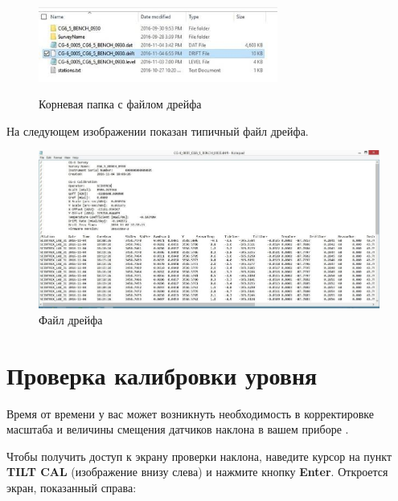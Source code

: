 \begin{figure}[H]
  \centering
  \includegraphics[width=0.7\textwidth]{figures/the_drift_file_under_root_folder}
  \caption{}Корневая папка с файлом дрейфа
  \label{fig:the_drift_file_under_root_folder}
\end{figure}

На следующем изображении показан типичный файл дрейфа.

\begin{figure}[H]
  \centering
  \includegraphics[width=\textwidth]{figures/the_drift_file}
  \caption{Файл дрейфа}
  \label{fig:the_drift_file}
\end{figure}

\section{Проверка калибровки уровня}

Время от времени у вас может возникнуть необходимость в корректировке масштаба и
величины смещения датчиков наклона в вашем приборе \cg{}.


Чтобы получить доступ к экрану проверки наклона, наведите курсор на пункт
\textbf{TILT CAL} (изображение внизу слева) и нажмите кнопку \textbf{Enter}.
Откроется экран, показанный справа:

